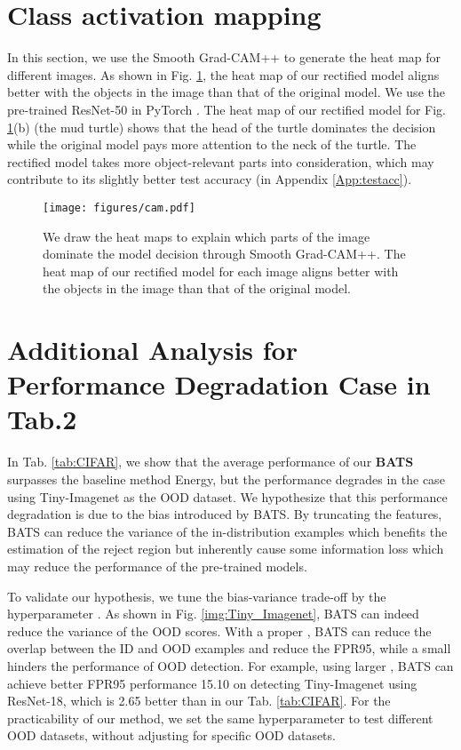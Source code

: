 \documentclass{article}
\begin{document}
\section{Class activation mapping}\label{App:activation}

In this section, we use the Smooth Grad-CAM++\cite{omeiza2019smooth} to generate the heat map for different images. As shown in Fig. \ref{img:cam}, the heat map of our rectified model aligns better with the objects in the image than that of the original model. We use the pre-trained ResNet-50 in PyTorch \cite{pytorch}. The heat map of our rectified model for Fig. \ref{img:cam}(b) (the mud turtle) shows that the head of the turtle dominates the decision while the original model pays more attention to the neck of the turtle. The rectified model takes more object-relevant parts into consideration, which may contribute to its slightly better test accuracy (in Appendix \ref{App:testacc}).

\begin{figure}[htbp]
\centering
\texttt{[image: figures/cam.pdf]}
\caption{We draw the heat maps to explain which parts of the image dominate the model decision through Smooth Grad-CAM++\cite{omeiza2019smooth}. The heat map of our rectified model for each image aligns better with the objects in the image than that of the original model. }
\label{img:cam}
\end{figure}

{
\section{Additional Analysis for Performance Degradation Case in Tab.2}\label{App:Degradation}
 In Tab. \ref{tab:CIFAR}, we show that the average performance of our \textbf{BATS} surpasses the baseline method Energy, but the performance degrades in the case using Tiny-Imagenet as the OOD dataset.
 We hypothesize that this performance degradation is due to the bias introduced by BATS. By truncating the features, BATS can reduce the variance of the in-distribution examples which benefits the estimation of the reject region but inherently cause some information loss which may reduce the performance of the pre-trained models. 
 
 To validate our hypothesis, we tune the bias-variance trade-off by the hyperparameter .
 As shown in Fig. \ref{img:Tiny_Imagenet}, BATS can indeed reduce the variance of the OOD scores. With a proper , BATS can reduce the overlap between the ID and OOD examples and reduce the FPR95, while a small  hinders the performance of OOD detection. For example, using larger , BATS can achieve better FPR95 performance 15.10 on detecting Tiny-Imagenet using ResNet-18, which is 2.65 better than  in our Tab. \ref{tab:CIFAR}. For the practicability of our method, we set the same hyperparameter to test different OOD datasets, without adjusting for specific OOD datasets.
 }
 
\end{document}
